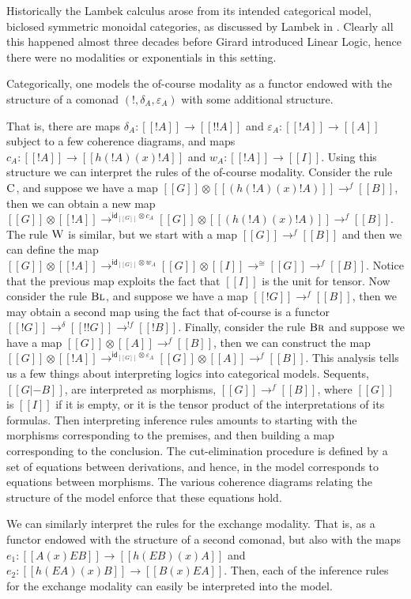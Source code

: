 \documentclass{article}
\let\mto\to                     %
\let\to\relax                   %
\newcommand{\to}{\rightarrow}
\newcommand{\id}{\mathsf{id}}
\begin{document}
Historically the Lambek calculus arose from its intended categorical model, biclosed symmetric monoidal categories, as discussed by Lambek in \cite{lambek1988}. Clearly all this happened almost three decades  before Girard introduced Linear Logic, hence there were no modalities or exponentials in this setting.


Categorically, one models the of-course modality as a functor endowed with the structure
of a comonad $(!, \delta_A, \varepsilon_A)$ with some additional structure.  

That is, there are maps
$\delta_A : [[!A]] \mto [[!!A]]$ and $\varepsilon_A : [[!A]] \mto [[A]]$
subject to a few coherence diagrams, and maps $c_A : [[!A]] \mto
[[h(!A) (x) !A]]$ and $w_A : [[!A]] \mto [[I]]$.  Using this structure we can
interpret the rules of the of-course modality.  Consider the rule
$\textsc{C}$, and suppose we have a map
$[[G]] \otimes [[(h(!A) (x) !A)]] \mto^{f} [[B]]$, then we can obtain
a new map
$[[G]] \otimes [[!A]] \mto^{\id_{[[G]]} \otimes c_A} [[G]] \otimes [[(h(!A) (x) !A)]] \mto^f [[B]]$.
The rule $\textsc{W}$ is similar, but we start with a map $[[G]]
\mto^f [[B]]$ and then we can define the map
$[[G]] \otimes [[!A]] \mto^{\id_{[[G]]} \otimes w_A} [[G]] \otimes [[I]] \mto^\cong [[G]] \mto^{f} [[B]]$.
Notice that the previous map exploits the fact that $[[I]]$ is the
unit for tensor.  Now consider the rule $\textsc{Bl}$, and suppose
we have a map $[[!{G}]] \mto^f [[B]]$, then we may obtain a second map
using the fact that of-course is a functor $[[!{G}]] \mto^{\delta}
[[!{!{G}}]] \mto^{!f} [[!B]]$.  Finally, consider the rule
$\textsc{Br}$ and suppose we have a map $[[G]] \otimes [[A]]
\mto^f [[B]]$, then we can construct the map
$[[G]] \otimes [[!A]] \mto^{\id_{[[G]]} \otimes \varepsilon_A} [[G]]
\otimes [[A]] \mto^f [[B]]$.  This analysis tells us a few things
about interpreting logics into categorical models.  Sequents, $[[G |-
    B]]$, are interpreted as morphisms, $[[G]] \mto^f [[B]]$, where
$[[G]]$ is $[[I]]$ if it is empty, or it is the tensor product of the
interpretations of its formulas.  Then interpreting inference rules
amounts to starting with the morphisms corresponding to the premises,
and then building a map corresponding to the conclusion.  The
cut-elimination procedure is defined by a set of equations between
derivations, and hence, in the model corresponds to equations between
morphisms.  The various coherence diagrams relating the structure of
the model enforce that these equations hold.

We can similarly interpret the rules for the exchange modality.
That is, as a functor endowed with the structure of a second comonad,
but also with the maps $e_1 : [[A (x) E B]] \mto [[h(E B) (x) A]]$ and
$e_2 : [[h(E A) (x) B]] \mto [[B (x) E A]]$.  Then, each of the
inference rules for the exchange modality can easily be interpreted
into the model.
\end{document}
